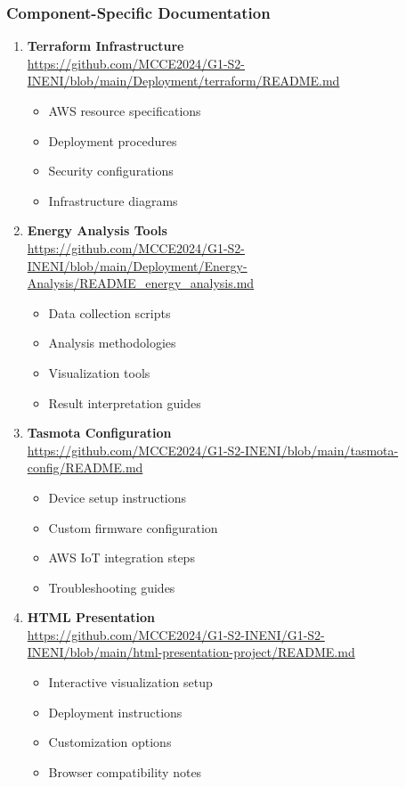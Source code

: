 \subsubsection{Component-Specific Documentation}
\begin{enumerate}
    \item \textbf{Terraform Infrastructure} \\
    \url{https://github.com/MCCE2024/G1-S2-INENI/blob/main/Deployment/terraform/README.md}
    \begin{itemize}
        \item AWS resource specifications
        \item Deployment procedures
        \item Security configurations
        \item Infrastructure diagrams
    \end{itemize}

    \item \textbf{Energy Analysis Tools} \\
    \label{appendix:energy-analysis}
    \url{https://github.com/MCCE2024/G1-S2-INENI/blob/main/Deployment/Energy-Analysis/README_energy_analysis.md}
    \begin{itemize}
        \item Data collection scripts
        \item Analysis methodologies
        \item Visualization tools
        \item Result interpretation guides
    \end{itemize}

    \item \textbf{Tasmota Configuration} \\
    \url{https://github.com/MCCE2024/G1-S2-INENI/blob/main/tasmota-config/README.md}
    \begin{itemize}
        \item Device setup instructions
        \item Custom firmware configuration
        \item AWS IoT integration steps
        \item Troubleshooting guides
    \end{itemize}

    \item \textbf{HTML Presentation} \\
    \url{https://github.com/MCCE2024/G1-S2-INENI/G1-S2-INENI/blob/main/html-presentation-project/README.md}
    \begin{itemize}
        \item Interactive visualization setup
        \item Deployment instructions
        \item Customization options
        \item Browser compatibility notes
    \end{itemize}
\end{enumerate}

